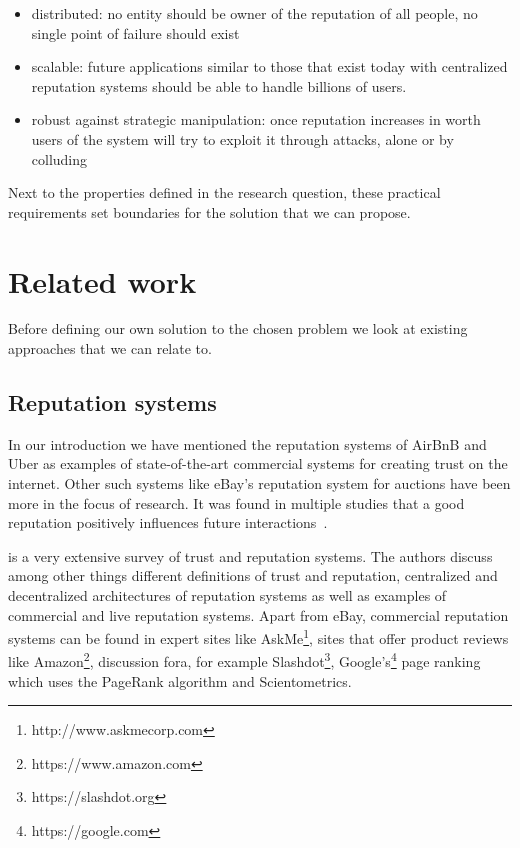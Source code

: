 
\begin{itemize}
    \item distributed: no entity should be owner of the reputation of all people, no single point of
    failure should exist
    \item scalable: future applications similar to those that exist today with centralized reputation
    systems should be able to handle billions of users.
    \item robust against strategic manipulation: once reputation increases in worth users of the 
    system will try to exploit it through attacks, alone or by colluding
\end{itemize}

Next to the properties defined in the research question, these practical requirements set boundaries
for the solution that we can propose.

\section{Related work}
Before defining our own solution to the chosen problem we look at existing approaches that we can 
relate to. 

\subsection{Reputation systems}
In our introduction we have mentioned the reputation systems of AirBnB and Uber as examples of 
state-of-the-art commercial systems for creating trust on the internet. Other such systems like 
eBay's reputation system for auctions have been more in the focus of research. It was found in 
multiple studies that a good reputation positively influences future interactions~\cite{resnick2002trust, houser2006reputation, dewan2004adverse}.

\cite{josang2007survey} is a very extensive survey of trust and reputation systems. The authors 
discuss among other things different definitions of trust and reputation, centralized and decentralized architectures 
of reputation systems as well as examples of commercial and live reputation systems. Apart from 
eBay, commercial reputation systems can be found in expert sites like AskMe\footnote{http://www.askmecorp.com},
sites that offer product reviews like Amazon\footnote{https://www.amazon.com}, discussion fora, 
for example Slashdot\footnote{https://slashdot.org}, Google's\footnote{https://google.com} page ranking which uses the PageRank
algorithm\cite{page1999pagerank} and Scientometrics. 

